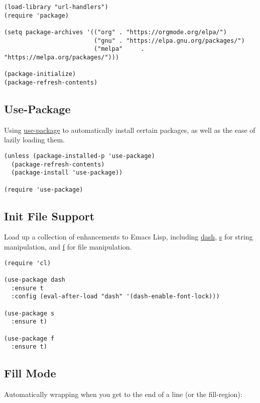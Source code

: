 \documentclass[12pt]{article}
\begin{document}
\lstset{language=Lisp,label= ,caption= ,captionpos=b,numbers=none}
\begin{lstlisting}
(load-library "url-handlers")
(require 'package)

(setq package-archives '(("org" . "https://orgmode.org/elpa/")
                         ("gnu" . "https://elpa.gnu.org/packages/")
                         ("melpa"     . "https://melpa.org/packages/")))

(package-initialize)
(package-refresh-contents)
\end{lstlisting}

\subsection{Use-Package}
\label{sec:orga53c11c}

Using \href{https://github.com/jwiegley/use-package}{use-package} to automatically install certain packages, as
well as the ease of lazily loading them.

\lstset{language=Lisp,label= ,caption= ,captionpos=b,numbers=none}
\begin{lstlisting}
(unless (package-installed-p 'use-package)
  (package-refresh-contents)
  (package-install 'use-package))

(require 'use-package)
\end{lstlisting}

\subsection{Init File Support}
\label{sec:org4cbf01e}

Load up a collection of enhancements to Emacs Lisp, including \href{https://github.com/magnars/dash.el}{dash},
\href{https://github.com/magnars/s.el}{s} for string manipulation, and \href{https://github.com/rejeep/f.el}{f} for file manipulation.

\lstset{language=Lisp,label= ,caption= ,captionpos=b,numbers=none}
\begin{lstlisting}
(require 'cl)

(use-package dash
  :ensure t
  :config (eval-after-load "dash" '(dash-enable-font-lock)))

(use-package s
  :ensure t)

(use-package f
  :ensure t)
\end{lstlisting}

\subsection{Fill Mode}
\label{sec:org3c1c90f}
Automatically wrapping when you get to the end of a line (or the fill-region):
\end{document}
